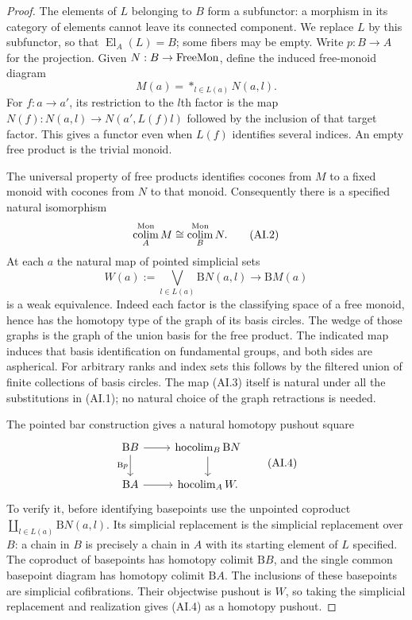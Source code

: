 \begin{proof}
The elements of $L$ belonging to $B$ form a subfunctor:
a morphism in its category of elements cannot leave its
connected component. We replace $L$ by this subfunctor,
so that $\operatorname{El}_A(L)=B$; some fibers may be empty.
Write $p:B\to A$ for the projection. Given
$N:B\to\mathrm{FreeMon}$, define the induced free-monoid diagram
\[
 M(a)=\mathop{*}_{l\in L(a)}N(a,l).
 \tag{AI.1}
\]
For $f:a\to a'$, its restriction to the $l$th factor is the
map $N(f):N(a,l)\to N(a',L(f)l)$ followed by the inclusion
of that target factor. This gives a functor even when
$L(f)$ identifies several indices. An empty free product is
the trivial monoid.

The universal property of free products identifies cocones
from $M$ to a fixed monoid with cocones from $N$ to that
monoid. Consequently there is a specified natural isomorphism
\[
 \operatorname*{colim}_A^{\mathrm{Mon}}M\cong\operatorname*{colim}_B^{\mathrm{Mon}}N.
 \tag{AI.2}
\]
At each $a$ the natural map of pointed simplicial sets
\[
 W(a):=\bigvee_{l\in L(a)}\mathrm B N(a,l)
       \longrightarrow \mathrm B M(a)
 \tag{AI.3}
\]
is a weak equivalence. Indeed each factor is the
classifying space of a free monoid, hence has the homotopy
type of the graph of its basis circles. The wedge of those
graphs is the graph of the union basis for the free product.
The indicated map induces that basis identification on
fundamental groups, and both sides are aspherical.
For arbitrary ranks and index sets this follows by the
filtered union of finite collections of basis circles.
The map (AI.3) itself is natural under all the substitutions
in (AI.1); no natural choice of the graph retractions is
needed.

The pointed bar construction gives a natural homotopy
pushout square
\[
\begin{tikzcd}
 \mathrm B B \arrow[r] \arrow[d,"\mathrm Bp"'] &
 \hocolim_{B}\mathrm B N \arrow[d] \\
 \mathrm B A \arrow[r] & \hocolim_A W.
\end{tikzcd}
 \tag{AI.4}
\]
To verify it, before identifying basepoints use the
unpointed coproduct
$\coprod_{l\in L(a)}\mathrm B N(a,l)$.
Its simplicial replacement is the simplicial replacement
over $B$: a chain in $B$ is precisely a chain in $A$ with
its starting element of $L$ specified. The coproduct of
basepoints has homotopy colimit $\mathrm B B$, and the
single common basepoint diagram has homotopy colimit
$\mathrm B A$. The inclusions of these basepoints are
simplicial cofibrations. Their objectwise pushout is $W$,
so taking the simplicial replacement and realization gives
(AI.4) as a homotopy pushout.


\end{proof}
